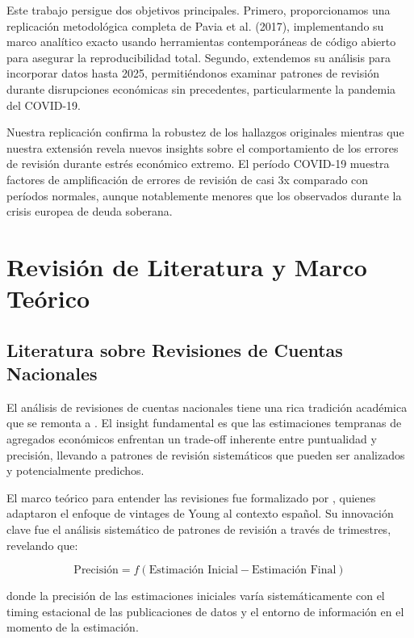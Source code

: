 \documentclass[12pt,a4paper]{article}
\begin{document}
Este trabajo persigue dos objetivos principales. Primero, proporcionamos una replicación metodológica completa de Pavia et al. (2017), implementando su marco analítico exacto usando herramientas contemporáneas de código abierto para asegurar la reproducibilidad total. Segundo, extendemos su análisis para incorporar datos hasta 2025, permitiéndonos examinar patrones de revisión durante disrupciones económicas sin precedentes, particularmente la pandemia del COVID-19.

Nuestra replicación confirma la robustez de los hallazgos originales mientras que nuestra extensión revela nuevos insights sobre el comportamiento de los errores de revisión durante estrés económico extremo. El período COVID-19 muestra factores de amplificación de errores de revisión de casi 3x comparado con períodos normales, aunque notablemente menores que los observados durante la crisis europea de deuda soberana.

\section{Revisión de Literatura y Marco Teórico}

\subsection{Literatura sobre Revisiones de Cuentas Nacionales}

El análisis de revisiones de cuentas nacionales tiene una rica tradición académica que se remonta a \citet{young1993}. El insight fundamental es que las estimaciones tempranas de agregados económicos enfrentan un trade-off inherente entre puntualidad y precisión, llevando a patrones de revisión sistemáticos que pueden ser analizados y potencialmente predichos.

El marco teórico para entender las revisiones fue formalizado por \citet{pavia2017}, quienes adaptaron el enfoque de vintages de Young al contexto español. Su innovación clave fue el análisis sistemático de patrones de revisión a través de trimestres, revelando que:

\begin{equation}
\text{Precisión} = f(\text{Estimación Inicial} - \text{Estimación Final})
\end{equation}

donde la precisión de las estimaciones iniciales varía sistemáticamente con el timing estacional de las publicaciones de datos y el entorno de información en el momento de la estimación.
\end{document}
